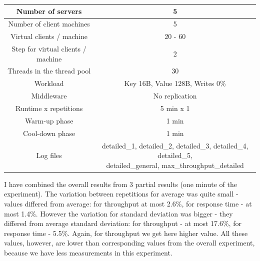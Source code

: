 \documentclass[11pt]{article}
\begin{document}
{\small
\smallskip
\begin{tabular}{|c|c|}
\hline Number of servers & 5 \\ 
\hline Number of client machines & 5 \\ 
\hline Virtual clients / machine &  20 - 60 \\ 
\hline Step for virtual clients / machine & 2 \\
\hline Threads in the thread pool & 30 \\
\hline Workload & Key 16B, Value 128B, Writes 0\% \\
\hline Middleware & No replication \\ 
\hline Runtime x repetitions & 5 min x 1 \\ 
\hline Warm-up phase & 1 min \\
\hline Cool-down phase & 1 min \\
\hline Log files & \parbox[t]{9cm}{detailed\_1, detailed\_2, detailed\_3, detailed\_4, detailed\_5, \\ detailed\_general, max\_throughput\_detailed} \\[3.4ex]
\hline 
\end{tabular} }
\medskip

I have combined the overall results from 3 partial results (one minute of the experiment). The variation between repetitions for average was quite small - values differed from average: for throughput at most 2.6\%, for response time - at most 1.4\%. However the variation for standard deviation was bigger - they differed from average standard deviation: for throughput - at most 17.6\%, for response time - 5.5\%. Again, for throughput we get here higher value. All these values, however, are lower than corresponding values from the overall experiment, because we have less measurements in this experiment.
\end{document}
